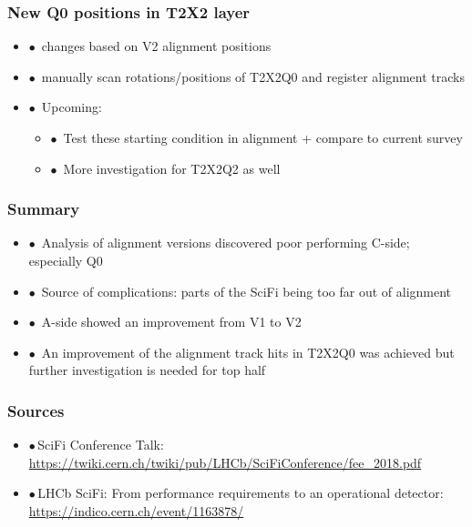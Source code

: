 \documentclass[aspectratio=1610, 12pt]{beamer}
\begin{document}
\begin{frame}\frametitle{New Q0 positions in T2X2 layer}
  \begin{itemize}
    \item $\bullet$\, changes based on V2 alignment positions
    \item $\bullet$\, manually scan rotations/positions of T2X2Q0 and register alignment tracks
    \item $\bullet$\, Upcoming:
    \begin{itemize}
      \item $\bullet$\, Test these starting condition in alignment + compare to current survey
      \item $\bullet$\, More investigation for T2X2Q2 as well
    \end{itemize}
  \end{itemize}
  \begin{figure}
  \end{figure}
\end{frame}

\begin{frame}\frametitle{Summary}
  \begin{itemize}
    \item $\bullet$\, Analysis of alignment versions discovered poor performing C-side; especially Q0
    \item $\bullet$\, Source of complications: parts of the SciFi being too far out of alignment
    \item $\bullet$\, A-side showed an improvement from V1 to V2
    \item $\bullet$\, An improvement of the alignment track hits in T2X2Q0 was achieved but further investigation is needed for top half
  \end{itemize}
\end{frame}

\begin{frame}\frametitle{Sources}
  \begin{itemize}
    \item $\bullet$\,SciFi Conference Talk: \url{https://twiki.cern.ch/twiki/pub/LHCb/SciFiConference/fee_2018.pdf}
    \item $\bullet$\,LHCb SciFi: From performance requirements to an operational detector: \url{https://indico.cern.ch/event/1163878/}
  \end{itemize}
\end{frame}
\end{document}
